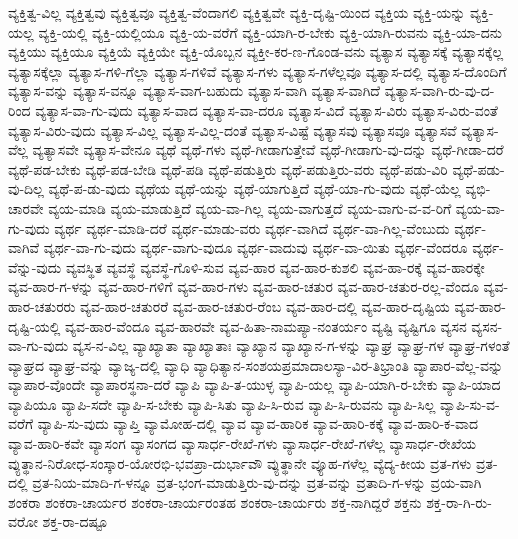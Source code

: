 {ವ್ಯಕ್ತಿತ್ವ-ವಿಲ್ಲ
ವ್ಯಕ್ತಿತ್ವವು
ವ್ಯಕ್ತಿತ್ವವೂ
ವ್ಯಕ್ತಿತ್ವ-ವೆಂದಾಗಲಿ
ವ್ಯಕ್ತಿತ್ವವೇ
ವ್ಯಕ್ತಿ-ದೃಷ್ಟಿ-ಯಿಂದ
ವ್ಯಕ್ತಿಯ
ವ್ಯಕ್ತಿ-ಯನ್ನು
ವ್ಯಕ್ತಿ-ಯಲ್ಲ
ವ್ಯಕ್ತಿ-ಯಲ್ಲಿ
ವ್ಯಕ್ತಿ-ಯಲ್ಲಿಯೂ
ವ್ಯಕ್ತಿ-ಯ-ವರೆಗೆ
ವ್ಯಕ್ತಿ-ಯಾಗಿ-ರ-ಬೇಕು
ವ್ಯಕ್ತಿ-ಯಾಗಿ-ರುವನು
ವ್ಯಕ್ತಿ-ಯಾ-ದನು
ವ್ಯಕ್ತಿಯು
ವ್ಯಕ್ತಿಯೂ
ವ್ಯಕ್ತಿಯೆ
ವ್ಯಕ್ತಿಯೇ
ವ್ಯಕ್ತಿ-ಯೊಬ್ಬನ
ವ್ಯಕ್ತೀ-ಕರ-ಣ-ಗೊಂಡ-ವನು
ವ್ಯತ್ಯಾಸ
ವ್ಯತ್ಯಾಸಕ್ಕೆ
ವ್ಯತ್ಯಾಸಕ್ಕೆಲ್ಲ
ವ್ಯತ್ಯಾಸಕ್ಕೆಲ್ಲಾ
ವ್ಯತ್ಯಾಸ-ಗಳಿ-ಗೆಲ್ಲಾ
ವ್ಯತ್ಯಾಸ-ಗಳಿವೆ
ವ್ಯತ್ಯಾಸ-ಗಳು
ವ್ಯತ್ಯಾಸ-ಗಳೆಲ್ಲವೂ
ವ್ಯತ್ಯಾಸ-ದಲ್ಲಿ
ವ್ಯತ್ಯಾಸ-ದೊಂದಿಗೆ
ವ್ಯತ್ಯಾಸ-ವನ್ನು
ವ್ಯತ್ಯಾಸ-ವನ್ನೂ
ವ್ಯತ್ಯಾಸ-ವಾಗ-ಬಹುದು
ವ್ಯತ್ಯಾಸ-ವಾಗಿ
ವ್ಯತ್ಯಾಸ-ವಾಗಿದೆ
ವ್ಯತ್ಯಾಸ-ವಾಗಿ-ರು-ವು-ದ-ರಿಂದ
ವ್ಯತ್ಯಾಸ-ವಾ-ಗು-ವುದು
ವ್ಯತ್ಯಾಸ-ವಾದ
ವ್ಯತ್ಯಾಸ-ವಾ-ದರೂ
ವ್ಯತ್ಯಾಸ-ವಿದೆ
ವ್ಯತ್ಯಾಸ-ವಿರು
ವ್ಯತ್ಯಾಸ-ವಿರು-ವಂತೆ
ವ್ಯತ್ಯಾಸ-ವಿರು-ವುದು
ವ್ಯತ್ಯಾಸ-ವಿಲ್ಲ
ವ್ಯತ್ಯಾಸ-ವಿಲ್ಲ-ದಂತೆ
ವ್ಯತ್ಯಾಸ-ವಿಷ್ಟೆ
ವ್ಯತ್ಯಾಸವು
ವ್ಯತ್ಯಾಸವೂ
ವ್ಯತ್ಯಾಸವೆ
ವ್ಯತ್ಯಾಸ-ವೆಲ್ಲ
ವ್ಯತ್ಯಾಸವೇ
ವ್ಯತ್ಯಾಸ-ವೇನೂ
ವ್ಯಥೆ
ವ್ಯಥೆ-ಗಳು
ವ್ಯಥೆ-ಗೀಡಾಗುತ್ತೇವೆ
ವ್ಯಥೆ-ಗೀಡಾಗು-ವು-ದನ್ನು
ವ್ಯಥೆ-ಗೀಡಾ-ದರೆ
ವ್ಯಥೆ-ಪಡ-ಬೇಕು
ವ್ಯಥೆ-ಪಡ-ಬೇಡಿ
ವ್ಯಥೆ-ಪಡಿ
ವ್ಯಥೆ-ಪಡುತ್ತಿರು
ವ್ಯಥೆ-ಪಡುತ್ತಿರು-ವರು
ವ್ಯಥೆ-ಪಡು-ವಿರಿ
ವ್ಯಥೆ-ಪಡು-ವು-ದಿಲ್ಲ
ವ್ಯಥೆ-ಪ-ಡು-ವುದು
ವ್ಯಥೆಯ
ವ್ಯಥೆ-ಯನ್ನು
ವ್ಯಥೆ-ಯಾಗುತ್ತಿದೆ
ವ್ಯಥೆ-ಯಾ-ಗು-ವುದು
ವ್ಯಥೆ-ಯೆಲ್ಲ
ವ್ಯಭಿ-ಚಾರವೇ
ವ್ಯಯ-ಮಾಡಿ
ವ್ಯಯ-ಮಾಡುತ್ತಿದೆ
ವ್ಯಯ-ವಾ-ಗಿಲ್ಲ
ವ್ಯಯ-ವಾಗುತ್ತದೆ
ವ್ಯಯ-ವಾಗು-ವ-ವ-ರಿಗೆ
ವ್ಯಯ-ವಾ-ಗು-ವುದು
ವ್ಯರ್ಥ
ವ್ಯರ್ಥ-ಮಾಡಿ-ದರೆ
ವ್ಯರ್ಥ-ಮಾಡು-ವರು
ವ್ಯರ್ಥ-ವಾಗಿದೆ
ವ್ಯರ್ಥ-ವಾ-ಗಿಲ್ಲ-ವೆಂಬುದು
ವ್ಯರ್ಥ-ವಾಗಿವೆ
ವ್ಯರ್ಥ-ವಾ-ಗು-ವುದು
ವ್ಯರ್ಥ-ವಾಗು-ವುದೂ
ವ್ಯರ್ಥ-ವಾದುವು
ವ್ಯರ್ಥ-ವಾ-ಯಿತು
ವ್ಯರ್ಥ-ವೆಂದರೂ
ವ್ಯರ್ಥ-ವೆನ್ನು-ವುದು
ವ್ಯವಸ್ಥಿತ
ವ್ಯವಸ್ಥೆ
ವ್ಯವಸ್ಥೆ-ಗೊಳಿ-ಸುವ
ವ್ಯವ-ಹಾರ
ವ್ಯವ-ಹಾರ-ಕುಶಲಿ
ವ್ಯವ-ಹಾ-ರಕ್ಕೆ
ವ್ಯವ-ಹಾರಕ್ಕೇ
ವ್ಯವ-ಹಾರ-ಗ-ಳನ್ನು
ವ್ಯವ-ಹಾರ-ಗಳಿಗೆ
ವ್ಯವ-ಹಾರ-ಗಳು
ವ್ಯವ-ಹಾರ-ಚತುರ
ವ್ಯವ-ಹಾರ-ಚತುರ-ರಲ್ಲ-ವೆಂದೂ
ವ್ಯವ-ಹಾರ-ಚತುರರು
ವ್ಯವ-ಹಾರ-ಚತುರರೆ
ವ್ಯವ-ಹಾರ-ಚತುರ-ರೆಂಬ
ವ್ಯವ-ಹಾರ-ದಲ್ಲಿ
ವ್ಯವ-ಹಾರ-ದೃಷ್ಟಿಯ
ವ್ಯವ-ಹಾರ-ದೃಷ್ಟಿ-ಯಲ್ಲಿ
ವ್ಯವ-ಹಾರ-ವೆಂದೂ
ವ್ಯವ-ಹಾರವೇ
ವ್ಯವ-ಹಿತಾ-ನಾಮಪ್ಯಾ-ನಂತರ್ಯಂ
ವ್ಯಷ್ಟಿ
ವ್ಯಷ್ಟಿಗೂ
ವ್ಯಸನ
ವ್ಯಸನ-ವಾ-ಗು-ವುದು
ವ್ಯಸ-ನ-ವಿಲ್ಲ
ವ್ಯಾಖ್ಯಾತಾ
ವ್ಯಾಖ್ಯಾತಾಃ
ವ್ಯಾಖ್ಯಾನ
ವ್ಯಾಖ್ಯಾನ-ಗ-ಳನ್ನು
ವ್ಯಾಘ್ರ
ವ್ಯಾಘ್ರ-ಗಳ
ವ್ಯಾಘ್ರ-ಗಳಂತೆ
ವ್ಯಾಘ್ರದ
ವ್ಯಾಘ್ರ-ವನ್ನು
ವ್ಯಾಜ್ಯ-ದಲ್ಲಿ
ವ್ಯಾಧಿ
ವ್ಯಾಧಿತ್ಯಾನ-ಸಂಶಯಪ್ರಮಾದಾಲಸ್ಯಾ-ವಿರ-ತಿಭ್ರಾಂತಿ
ವ್ಯಾಪಾರ-ವೆಲ್ಲ-ವನ್ನು
ವ್ಯಾಪಾರ-ವೊಂದೇ
ವ್ಯಾಪಾರಸ್ಥನಾ-ದರೆ
ವ್ಯಾಪಿ
ವ್ಯಾಪಿ-ತ-ಯುಳ್ಳ
ವ್ಯಾಪಿ-ಯಲ್ಲ
ವ್ಯಾಪಿ-ಯಾಗಿ-ರ-ಬೇಕು
ವ್ಯಾಪಿ-ಯಾದ
ವ್ಯಾಪಿಯೂ
ವ್ಯಾಪಿ-ಸದೇ
ವ್ಯಾಪಿ-ಸ-ಬೇಕು
ವ್ಯಾಪಿ-ಸಿತು
ವ್ಯಾಪಿ-ಸಿ-ರುವ
ವ್ಯಾಪಿ-ಸಿ-ರುವನು
ವ್ಯಾಪಿ-ಸಿಲ್ಲ
ವ್ಯಾಪಿ-ಸು-ವ-ವರೆಗೆ
ವ್ಯಾಪಿ-ಸು-ವುದು
ವ್ಯಾಪ್ತಿ
ವ್ಯಾಮೋಹ-ದಲ್ಲಿ
ವ್ಯಾವ
ವ್ಯಾವ-ಹಾರಿಕ
ವ್ಯಾವ-ಹಾರಿ-ಕಕ್ಕೆ
ವ್ಯಾವ-ಹಾರಿ-ಕ-ವಾದ
ವ್ಯಾವ-ಹಾರಿ-ಕವೇ
ವ್ಯಾಸಂಗ
ವ್ಯಾಸಂಗದ
ವ್ಯಾಸಾರ್ಧ-ರೇಖೆ-ಗಳು
ವ್ಯಾಸಾರ್ಧ-ರೇಖೆ-ಗಳೆಲ್ಲ
ವ್ಯಾಸಾರ್ಧ-ರೇಖೆಯ
ವ್ಯುತ್ಥಾನ-ನಿರೋಧ-ಸಂಸ್ಕಾರ-ಯೋರಭಿ-ಭವಪ್ರಾ-ದುರ್ಭಾವೌ
ವ್ಯುತ್ಥಾನೇ
ವ್ಯೂಹ-ಗಳೆಲ್ಲ
ವ್ಯೆದ್ಯ-ಕೀಯ
ವ್ರತ-ಗಳು
ವ್ರತ-ದಲ್ಲಿ
ವ್ರತ-ನಿಯ-ಮಾದಿ-ಗ-ಳನ್ನೂ
ವ್ರತ-ಭಂಗ-ಮಾಡುತ್ತಿರು-ವು-ದನ್ನು
ವ್ರತ-ವನ್ನು
ವ್ರತಾದಿ-ಗ-ಳನ್ನು
ವ್ರಯ-ವಾಗಿ
ಶಂಕರಾ
ಶಂಕರಾ-ಚಾರ್ಯರ
ಶಂಕರಾ-ಚಾರ್ಯರಂತಹ
ಶಂಕರಾ-ಚಾರ್ಯರು
ಶಕ್ತ-ನಾಗಿದ್ದರೆ
ಶಕ್ತನು
ಶಕ್ತ-ರಾ-ಗಿ-ರು-ವರೋ
ಶಕ್ತ-ರಾ-ದಷ್ಟೂ
}
